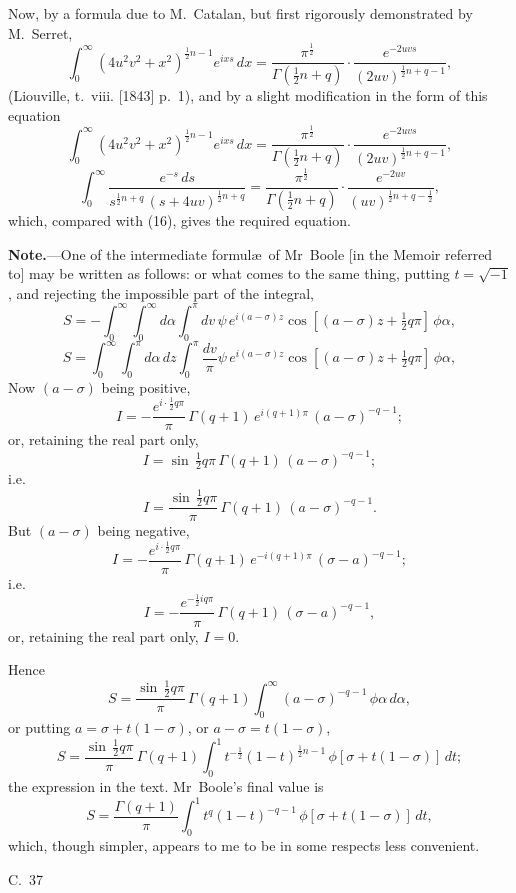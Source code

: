 \documentclass[11pt,a4paper]{article}
\begin{document}
Now, by a formula due to M.~Catalan, but first rigorously demonstrated by M.~Serret,
\[
\int_0^\infty (4u^2v^2 + x^2)^{\frac{1}{2}n-1} e^{ixs}\,dx = \frac{\pi^{\frac{1}{2}}}{\Gamma(\frac{1}{2}n+q)} \cdot \frac{e^{-2uvs}}{(2uv)^{\frac{1}{2}n+q-1}},
\]
(Liouville, t.~viii. [1843] p.~1), and by a slight modification in the form of this equation
\[
\int_0^\infty (4u^2v^2 + x^2)^{\frac{1}{2}n-1} e^{ixs}\,dx = \frac{\pi^{\frac{1}{2}}}{\Gamma(\frac{1}{2}n+q)} \cdot \frac{e^{-2uvs}}{(2uv)^{\frac{1}{2}n+q-1}},
\]
\[
\int_0^\infty \frac{e^{-s}\,ds}{s^{\frac{1}{2}n+q}\,(s+4uv)^{\frac{1}{2}n+q}} = \frac{\pi^{\frac{1}{2}}}{\Gamma(\frac{1}{2}n+q)} \cdot \frac{e^{-2uv}}{(uv)^{\frac{1}{2}n+q-\frac{1}{2}}},
\]
which, compared with (16), gives the required equation.

\vspace{10pt}
\textbf{Note.}---One of the intermediate formul\ae\ of Mr~Boole [in the Memoir referred to] may be written as follows: or what comes to the same thing, putting $t = \surd{-1}$, and rejecting the impossible part of the integral,
\[
S = -\int_0^\infty \int_0^\infty d\alpha \int_0^\pi dv\,\psi\,e^{i(a-\sigma)z} \cos[(a-\sigma)z + \tfrac{1}{2}q\pi]\,\phi\alpha,
\]
\[
S = \int_0^\infty \int_0^\pi d\alpha\,dz \int_0^\pi \frac{dv}{\pi} \psi\,e^{i(a-\sigma)z} \cos[(a-\sigma)z + \tfrac{1}{2}q\pi]\,\phi\alpha,
\]
Now $(a-\sigma)$ being positive,
\[
I = -\frac{e^{i\cdot\frac{1}{2}q\pi}}{\pi}\,\Gamma(q+1)\,e^{i(q+1)\pi}\,(a-\sigma)^{-q-1};
\]
or, retaining the real part only,
\[
I = \sin\,\tfrac{1}{2}q\pi\,\Gamma(q+1)\,(a-\sigma)^{-q-1};
\]
i.e.
\[
I = \frac{\sin\,\tfrac{1}{2}q\pi}{\pi}\,\Gamma(q+1)\,(a-\sigma)^{-q-1}.
\]
But $(a-\sigma)$ being negative,
\[
I = -\frac{e^{i\cdot\frac{1}{2}q\pi}}{\pi}\,\Gamma(q+1)\,e^{-i(q+1)\pi}\,(\sigma-a)^{-q-1};
\]
i.e.
\[
I = -\frac{e^{-\frac{1}{2}i q\pi}}{\pi}\,\Gamma(q+1)\,(\sigma-a)^{-q-1},
\]
or, retaining the real part only, $I = 0$.

Hence
\[
S = \frac{\sin\,\tfrac{1}{2}q\pi}{\pi}\,\Gamma(q+1) \int_0^\infty (a-\sigma)^{-q-1}\,\phi\alpha\,d\alpha,
\]
or putting $a = \sigma + t(1-\sigma)$, or $a-\sigma = t(1-\sigma)$,
\[
S = \frac{\sin\,\tfrac{1}{2}q\pi}{\pi}\,\Gamma(q+1) \int_0^1 t^{-\frac{1}{2}}(1-t)^{\frac{1}{2}n-1}\,\phi[\sigma + t(1-\sigma)]\,dt;
\]
the expression in the text. Mr~Boole's final value is
\[
S = \frac{\Gamma(q+1)}{\pi} \int_0^1 t^{q}(1-t)^{-q-1}\,\phi[\sigma + t(1-\sigma)]\,dt,
\]
which, though simpler, appears to me to be in some respects less convenient.

\begin{center}
C.~37
\end{center}
\end{document}
